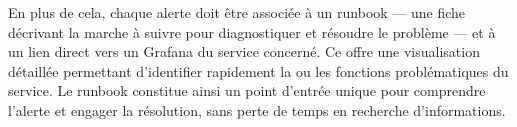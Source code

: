 En plus de cela, chaque alerte doit être associée à un runbook — une fiche décrivant la marche à suivre pour
diagnostiquer et résoudre le problème — et à un lien direct vers un 
Grafana du service concerné. Ce  offre une visualisation détaillée permettant d'identifier
rapidement la ou les fonctions problématiques du service. Le runbook constitue ainsi un point d'entrée
unique pour comprendre l'alerte et engager la résolution, sans perte de temps en recherche
d'informations.

